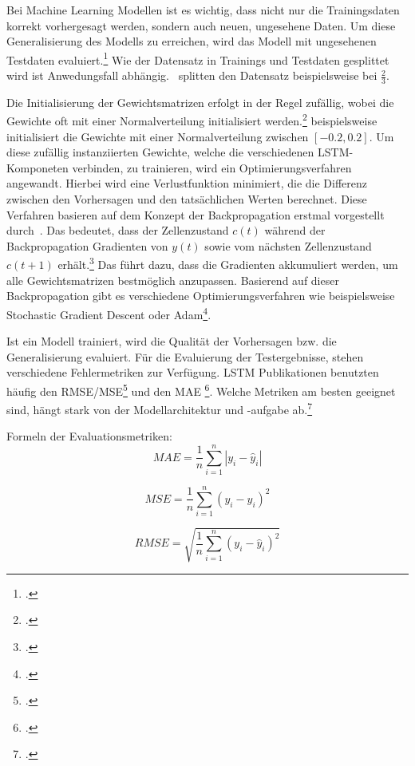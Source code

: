 Bei Machine Learning Modellen ist es wichtig, dass nicht nur die Trainingsdaten korrekt vorhergesagt werden, sondern auch neuen, ungesehene Daten. Um diese Generalisierung des Modells zu erreichen, wird das Modell mit ungesehenen Testdaten evaluiert.\footcite[Vgl.][S. 191]{Panesar2021}
Wie der Datensatz in Trainings und Testdaten gesplittet wird ist Anwedungsfall abhängig.~\cite[][]{Chen2022} splitten den Datensatz beispielsweise bei $\frac{2}{3}$.

Die Initialisierung der Gewichtsmatrizen erfolgt in der Regel zufällig, wobei die Gewichte oft mit einer Normalverteilung initialisiert werden.\footcite[Vgl.][]{Chen2022, Sak2014}
\cite[][]{Sak2014} beispielsweise initialisiert die Gewichte mit einer Normalverteilung zwischen $[-0.2, 0.2]$.
Um diese zufällig instanziierten Gewichte, welche die verschiedenen \ac{LSTM}-Komponeten verbinden, zu trainieren, wird ein Optimierungsverfahren angewandt. Hierbei wird eine Verlustfunktion minimiert, die die Differenz zwischen den Vorhersagen und den tatsächlichen Werten berechnet.
Diese Verfahren basieren auf dem Konzept der Backpropagation erstmal vorgestellt durch~\cite{Werbos1990}. 
Das bedeutet, dass der Zellenzustand \(c(t)\) während der Backpropagation Gradienten von \(y(t)\) sowie vom nächsten Zellenzustand \(c(t+1)\) erhält.\footcite[Vgl.][S. 5933]{VanHoudt2020} Das führt dazu, dass die Gradienten akkumuliert werden, um alle Gewichtsmatrizen bestmöglich anzupassen. 
Basierend auf dieser Backpropagation gibt es verschiedene Optimierungsverfahren wie beispielsweise Stochastic Gradient Descent oder Adam\footcite[Vgl.][]{Kingma2014}.

Ist ein Modell trainiert, wird die Qualität der Vorhersagen bzw. die Generalisierung evaluiert.
Für die Evaluierung der Testergebnisse, stehen verschiedene Fehlermetriken zur Verfügung. LSTM Publikationen benutzten häufig den \ac{RMSE}/\ac{MSE}\footcite[Vgl.][]{Yu2023,Sagheer2019,Chen2022} und den \ac{MAE} \footcite[Vgl.][]{Chen2022}.
Welche Metriken am besten geeignet sind, hängt stark von der Modellarchitektur und -aufgabe ab.\footcite[Vgl.][S. 201]{Panesar2021}


Formeln der Evaluationsmetriken:
    \[ MAE = \frac{1}{n} \sum_{i=1}^{n} |y_i - \hat{y}_i| \]
  
    \[ MSE = \frac{1}{n} \sum_{i=1}^{n} (y_i - \hat{y}_i)^2 \]
  
    \[ RMSE = \sqrt{\frac{1}{n} \sum_{i=1}^{n} (y_i - \hat{y}_i)^2} \]

